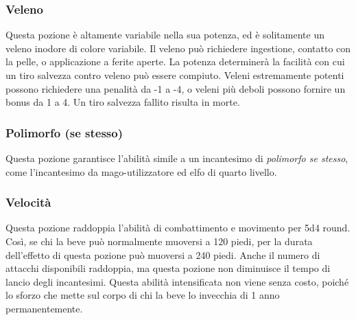 \documentclass{article}
\begin{document}
\begin{multicols}{2}
\subsubsection{Veleno}
Questa pozione è altamente variabile nella sua potenza, ed è solitamente un veleno inodore di colore variabile. Il veleno può richiedere ingestione, contatto con la pelle, o applicazione a ferite aperte. La potenza determinerà la facilità con cui un tiro salvezza contro veleno può essere compiuto. Veleni estremamente potenti possono richiedere una penalità da -1 a -4, o veleni più deboli possono fornire un bonus da 1 a 4. Un tiro salvezza fallito risulta in morte.

\subsubsection{Polimorfo (se stesso)}
Questa pozione garantisce l'abilità simile a un incantesimo di \textit{polimorfo se stesso}, come l'incantesimo da mago-utilizzatore ed elfo di quarto livello.

\subsubsection{Velocità}
Questa pozione raddoppia l'abilità di combattimento e movimento per 5d4 round. Così, se chi la beve può normalmente muoversi a 120 piedi, per la durata dell'effetto di questa pozione può muoversi a 240 piedi. Anche il numero di attacchi disponibili raddoppia, ma questa pozione non diminuisce il tempo di lancio degli incantesimi. Questa abilità intensificata non viene senza costo, poiché lo sforzo che mette sul corpo di chi la beve lo invecchia di 1 anno permanentemente.

\end{multicols}
\end{document}
